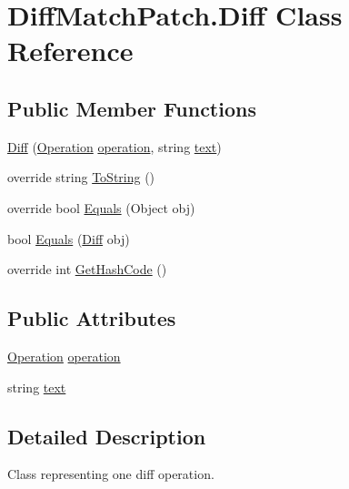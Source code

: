 \hypertarget{class_diff_match_patch_1_1_diff}{}\section{Diff\+Match\+Patch.\+Diff Class Reference}
\label{class_diff_match_patch_1_1_diff}
\subsection*{Public Member Functions}
\begin{DoxyCompactItemize}
\item 
\hyperlink{class_diff_match_patch_1_1_diff_a1b5f04a4e376dda3af8a4f38f5b01826}{Diff} (\hyperlink{namespace_diff_match_patch_ad70dddf4b74fd84a225659bb55739feb}{Operation} \hyperlink{class_diff_match_patch_1_1_diff_ae5a0db887ce3e79bd6cc180c8a15296f}{operation}, string \hyperlink{class_diff_match_patch_1_1_diff_a8621592a1b31db7c21d605e50e1f558a}{text})
\item 
override string \hyperlink{class_diff_match_patch_1_1_diff_a8c8546902ac4045456962ec05c3c04b3}{To\+String} ()
\item 
override bool \hyperlink{class_diff_match_patch_1_1_diff_aea9211fb4a43e0d1378b86fab7fe02ac}{Equals} (Object obj)
\item 
bool \hyperlink{class_diff_match_patch_1_1_diff_a973798b53356a5119755dc075b81352c}{Equals} (\hyperlink{class_diff_match_patch_1_1_diff}{Diff} obj)
\item 
override int \hyperlink{class_diff_match_patch_1_1_diff_a7fb5c74c39702d9f4223bfbb26542a7a}{Get\+Hash\+Code} ()
\end{DoxyCompactItemize}
\subsection*{Public Attributes}
\begin{DoxyCompactItemize}
\item 
\hyperlink{namespace_diff_match_patch_ad70dddf4b74fd84a225659bb55739feb}{Operation} \hyperlink{class_diff_match_patch_1_1_diff_ae5a0db887ce3e79bd6cc180c8a15296f}{operation}
\item 
string \hyperlink{class_diff_match_patch_1_1_diff_a8621592a1b31db7c21d605e50e1f558a}{text}
\end{DoxyCompactItemize}


\subsection{Detailed Description}
Class representing one diff operation. 


